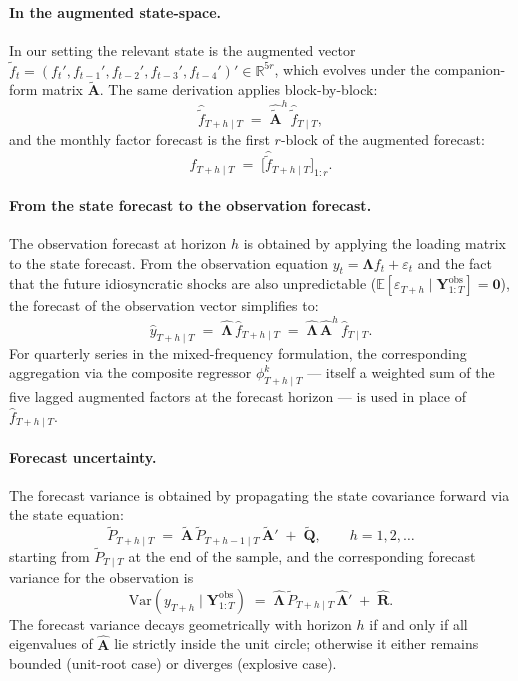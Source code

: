 \documentclass[11pt, a4paper, oneside]{article}
\begin{document}
\paragraph{In the augmented state-space.}
In our setting the relevant state is the augmented vector
$\tilde{f}_t = (f_t', f_{t-1}', f_{t-2}', f_{t-3}', f_{t-4}')' \in \mathbb{R}^{5r}$,
which evolves under the companion-form matrix $\tilde{\mathbf{A}}$. The same derivation
applies block-by-block:
\begin{equation}
\hat{\tilde{f}}_{T+h \mid T} \;=\; \hat{\tilde{\mathbf{A}}}^h\, \hat{\tilde{f}}_{T \mid T},
\label{eq:state-forecast-augmented}
\end{equation}
and the monthly factor forecast is the first $r$-block of the augmented
forecast:
\[
\hat{f}_{T+h \mid T} \;=\; \big[\hat{\tilde{f}}_{T+h \mid T}\big]_{1{:}r}.
\]

\paragraph{From the state forecast to the observation forecast.}
The observation forecast at horizon $h$ is obtained by applying the
loading matrix to the state forecast. From the observation equation
$y_t = \boldsymbol{\Lambda} f_t + \varepsilon_t$ and the fact that
the future idiosyncratic shocks are also unpredictable
($\mathbb{E}[\varepsilon_{T+h} \mid \mathbf{Y}^{\mathrm{obs}}_{1:T}] = \mathbf{0}$),
the forecast of the observation vector simplifies to:
\begin{equation}
\hat{y}_{T+h \mid T} \;=\; \hat{\boldsymbol{\Lambda}}\, \hat{f}_{T+h \mid T}
\;=\; \hat{\boldsymbol{\Lambda}}\, \hat{\mathbf{A}}^h\, \hat{f}_{T \mid T}.
\label{eq:obs-forecast}
\end{equation}
For quarterly series in the mixed-frequency formulation, the
corresponding aggregation via the composite regressor
$\phi^k_{T+h \mid T}$ — itself a weighted sum of the five lagged
augmented factors at the forecast horizon — is used in place of
$\hat{f}_{T+h \mid T}$.

\paragraph{Forecast uncertainty.}
The forecast variance is obtained by propagating the state covariance
forward via the state equation:
\begin{equation}
\tilde{P}_{T+h \mid T} \;=\; \tilde{\mathbf{A}}\, \tilde{P}_{T+h-1 \mid T}\, \tilde{\mathbf{A}}' \;+\; \tilde{\mathbf{Q}},
\qquad h = 1, 2, \ldots
\end{equation}
starting from $\tilde{P}_{T \mid T}$ at the end of the sample, and
the corresponding forecast variance for the observation is
\begin{equation}
\mathrm{Var}(y_{T+h} \mid \mathbf{Y}^{\mathrm{obs}}_{1:T})
\;=\; \hat{\boldsymbol{\Lambda}}\, \tilde{P}_{T+h \mid T}\, \hat{\boldsymbol{\Lambda}}'
\;+\; \hat{\mathbf{R}}.
\end{equation}
The forecast variance decays geometrically with horizon $h$ if and only
if all eigenvalues of $\hat{\mathbf{A}}$ lie strictly inside the unit
circle; otherwise it
either remains bounded (unit-root case) or diverges (explosive case).
\end{document}

